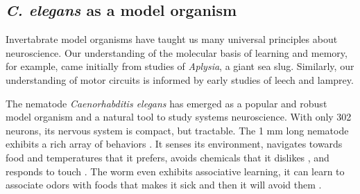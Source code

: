


%







\subsection{\textit{C. elegans} as a model organism}
Invertabrate model organisms have taught us many universal principles about neuroscience.  Our understanding of the molecular basis of learning and memory, for example, came initially from studies of \textit{Aplysia}, a giant sea slug.  Similarly, our understanding of motor circuits is informed by early studies of leech and lamprey. 

The nematode \textit{Caenorhabditis elegans} has emerged as a popular and robust model organism and a natural tool to study systems neuroscience. With only 302 neurons, its nervous system is compact, but tractable. The 1 mm long nematode exhibits a rich array of behaviors \citep{croll_components_1975}. It senses its environment,  navigates towards  food \cite{grewal_migration_1992}  and temperatures \cite{ryu_thermotaxis_2002} that it prefers,  avoids chemicals that it dislikes \citep{croll_behavoural_1975}, and responds to touch \citep{chalfie_neural_1985}. The worm even exhibits associative learning, it can learn to associate odors with foods that makes it sick and then it will avoid them \citep{zhang_pathogenic_2005}. 

